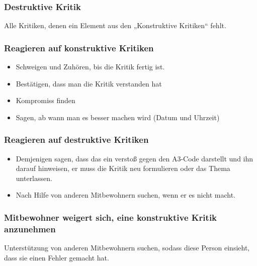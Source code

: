 \documentclass[10pt,a4paper,final]{article}
\begin{document}
\subsubsection{Destruktive Kritik} Alle Kritiken, denen ein Element aus den „Konstruktive Kritiken“ fehlt.

\subsubsection{Reagieren auf konstruktive Kritiken}

\begin{itemize}
\item Schweigen und Zuhören, bis die Kritik fertig ist.
\item Bestätigen, dass man die Kritik verstanden hat
\item Kompromiss finden
\item Sagen, ab wann man es besser machen wird (Datum und Uhrzeit)
\end{itemize}

\subsubsection{Reagieren auf destruktive Kritiken}

\begin{itemize}
\item Demjenigen sagen, dass das ein verstoß gegen den A3-Code darstellt und ihn darauf hinweisen, er muss die Kritik neu formulieren oder das Thema unterlassen.
\item Nach Hilfe von anderen Mitbewohnern suchen, wenn er es nicht macht.
\end{itemize}

\subsubsection{Mitbewohner weigert sich, eine konstruktive Kritik anzunehmen}
Unterstützung von anderen Mitbewohnern suchen, sodass diese Person einsieht, dass sie einen Fehler gemacht hat.
\end{document}

